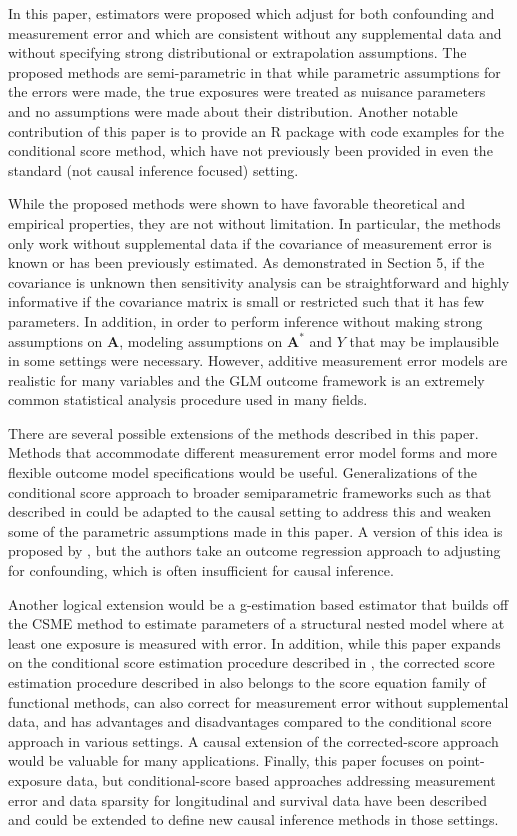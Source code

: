 \documentclass[useAMS,usenatbib,referee]{biom}
\begin{document}
In this paper, estimators were proposed which adjust for both confounding and measurement error and which are consistent without any supplemental data and without specifying strong distributional or extrapolation assumptions. The proposed methods are semi-parametric in that while parametric assumptions for the errors were made, the true exposures were treated as nuisance parameters and no assumptions were made about their distribution. Another notable contribution of this paper is to provide an R package with code examples for the conditional score method, which have not previously been provided in even the standard (not causal inference focused) setting.

While the proposed methods were shown to have favorable theoretical and empirical properties, they are not without limitation. In particular, the methods only work without supplemental data if the covariance of measurement error is known or has been previously estimated. As demonstrated in Section 5, if the covariance is unknown then sensitivity analysis can be straightforward and highly informative if the covariance matrix is small or restricted such that it has few parameters. In addition, in order to perform inference without making strong assumptions on $\bm{A}$, modeling assumptions on $\bm{A}^{*}$ and $Y$ that may be implausible in some settings were necessary. However, additive measurement error models are realistic for many variables and the GLM outcome framework is an extremely common statistical analysis procedure used in many fields.

There are several possible extensions of the methods described in this paper. Methods that accommodate different measurement error model forms and more flexible outcome model specifications would be useful. Generalizations of the conditional score approach to broader semiparametric frameworks such as that described in \citet{tsiatis2004} could be adapted to the causal setting to address this and weaken some of the parametric assumptions made in this paper. A version of this idea is proposed by \citet{liu2017}, but the authors take an outcome regression approach to adjusting for confounding, which is often insufficient for causal inference.

Another logical extension would be a g-estimation based estimator that builds off the CSME method to estimate parameters of a structural nested model where at least one exposure is measured with error. In addition, while this paper expands on the conditional score estimation procedure described in \citet{stefanski1987}, the corrected score estimation procedure described in \citet{nakamura1990} also belongs to the score equation family of functional methods, can also correct for measurement error without supplemental data, and has advantages and disadvantages compared to the conditional score approach in various settings. A causal extension of the corrected-score approach would be valuable for many applications. Finally, this paper focuses on point-exposure data, but conditional-score based approaches addressing measurement error and data sparsity for longitudinal and survival data have been described and could be extended to define new causal inference methods in those settings.
\end{document}
